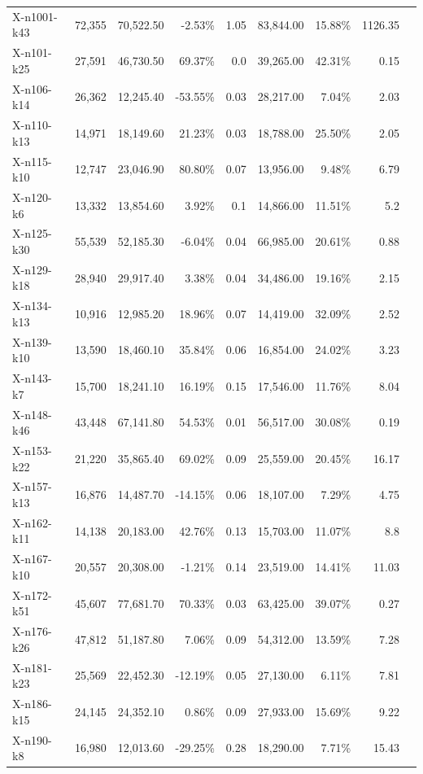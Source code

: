 \documentclass[12pt,a4paper]{article}
\begin{document}
\begin{longtable}{@{}lrrrrrrrr@{}}
    X-n1001-k43 & 72,355 & 70,522.50 & -2.53\% & 1.05 & 83,844.00 & 15.88\% & 1126.35 \\
    X-n101-k25 & 27,591 & 46,730.50 & 69.37\% & 0.0 & 39,265.00 & 42.31\% & 0.15 \\
    X-n106-k14 & 26,362 & 12,245.40 & -53.55\% & 0.03 & 28,217.00 & 7.04\% & 2.03 \\
    X-n110-k13 & 14,971 & 18,149.60 & 21.23\% & 0.03 & 18,788.00 & 25.50\% & 2.05 \\
    X-n115-k10 & 12,747 & 23,046.90 & 80.80\% & 0.07 & 13,956.00 & 9.48\% & 6.79 \\
    X-n120-k6 & 13,332 & 13,854.60 & 3.92\% & 0.1 & 14,866.00 & 11.51\% & 5.2 \\
    X-n125-k30 & 55,539 & 52,185.30 & -6.04\% & 0.04 & 66,985.00 & 20.61\% & 0.88 \\
    X-n129-k18 & 28,940 & 29,917.40 & 3.38\% & 0.04 & 34,486.00 & 19.16\% & 2.15 \\
    X-n134-k13 & 10,916 & 12,985.20 & 18.96\% & 0.07 & 14,419.00 & 32.09\% & 2.52 \\
    X-n139-k10 & 13,590 & 18,460.10 & 35.84\% & 0.06 & 16,854.00 & 24.02\% & 3.23 \\
    X-n143-k7 & 15,700 & 18,241.10 & 16.19\% & 0.15 & 17,546.00 & 11.76\% & 8.04 \\
    X-n148-k46 & 43,448 & 67,141.80 & 54.53\% & 0.01 & 56,517.00 & 30.08\% & 0.19 \\
    X-n153-k22 & 21,220 & 35,865.40 & 69.02\% & 0.09 & 25,559.00 & 20.45\% & 16.17 \\
    X-n157-k13 & 16,876 & 14,487.70 & -14.15\% & 0.06 & 18,107.00 & 7.29\% & 4.75 \\
    X-n162-k11 & 14,138 & 20,183.00 & 42.76\% & 0.13 & 15,703.00 & 11.07\% & 8.8 \\
    X-n167-k10 & 20,557 & 20,308.00 & -1.21\% & 0.14 & 23,519.00 & 14.41\% & 11.03 \\
    X-n172-k51 & 45,607 & 77,681.70 & 70.33\% & 0.03 & 63,425.00 & 39.07\% & 0.27 \\
    X-n176-k26 & 47,812 & 51,187.80 & 7.06\% & 0.09 & 54,312.00 & 13.59\% & 7.28 \\
    X-n181-k23 & 25,569 & 22,452.30 & -12.19\% & 0.05 & 27,130.00 & 6.11\% & 7.81 \\
    X-n186-k15 & 24,145 & 24,352.10 & 0.86\% & 0.09 & 27,933.00 & 15.69\% & 9.22 \\
    X-n190-k8 & 16,980 & 12,013.60 & -29.25\% & 0.28 & 18,290.00 & 7.71\% & 15.43 \\

\end{longtable}
\end{document}
